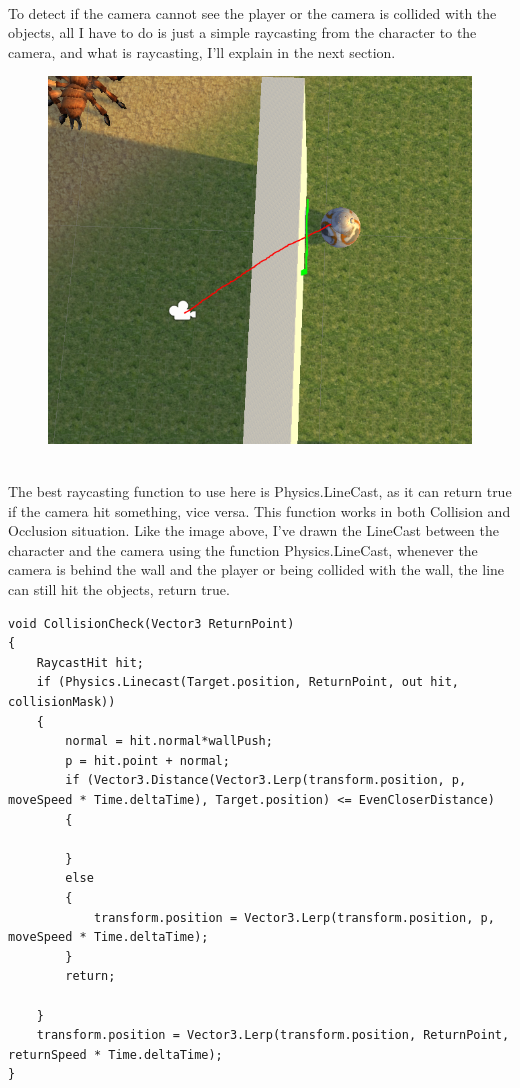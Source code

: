 \documentclass[a4paper, 13pt]{extarticle}
\begin{document}
\\[0.05cm] To detect if the camera cannot see the player or the camera is collided with the objects, all I have to do is just a simple raycasting from the character to the camera, and what is raycasting, I'll explain in the next section. 
\begin{figure}[h]
	\centering
	\begin{minipage}{.4\textwidth}
		\centering
		\includegraphics[width=1.3\linewidth]{intructions/raycasting.png}
		\centering
		\label{fig:test13}
	\end{minipage}
\end{figure} 
\\[0.05cm]
The best raycasting function to use here is Physics.LineCast, as it can return true if the camera hit something, vice versa. This function works in both Collision and Occlusion situation. Like the image above, I've drawn the LineCast between the character and the camera using the function Physics.LineCast, whenever the camera is behind the wall and the player or being collided with the wall, the line can still hit the objects, return true. 
\begin{lstlisting}
void CollisionCheck(Vector3 ReturnPoint)
{
	RaycastHit hit;
	if (Physics.Linecast(Target.position, ReturnPoint, out hit, collisionMask))
	{
		normal = hit.normal*wallPush;
		p = hit.point + normal;
		if (Vector3.Distance(Vector3.Lerp(transform.position, p, moveSpeed * Time.deltaTime), Target.position) <= EvenCloserDistance)
		{

		}
		else
		{
			transform.position = Vector3.Lerp(transform.position, p, moveSpeed * Time.deltaTime);
		}
		return;

	}
	transform.position = Vector3.Lerp(transform.position, ReturnPoint, returnSpeed * Time.deltaTime);
}
\end{lstlisting}
\end{document}
